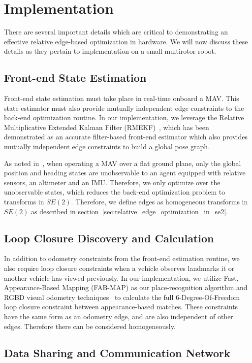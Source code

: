 
\section{Implementation}
There are several important details which are critical to demonstrating an effective relative edge-based optimization in hardware.  We will now discuss these details as they pertain to implementation on a small multirotor robot.

\subsection{Front-end State Estimation}Front-end state estimation must take place in real-time onboard a MAV. This state estimator must also provide mutually independent edge constraints to the back-end optimization routine.  In our implementation, we leverage the Relative Multiplicative Extended Kalman Filter (RMEKF)~\cite{Koch2017}, which has been demonstrated as an accurate filter-based front-end estimator which also provides mutually independent edge constraints to build a global pose graph.

As noted in~\cite{Wheeler2017a}, when operating a MAV over a flat ground plane, only the global position and heading states are unobservable to an agent equipped with relative sensors, an altimeter and an IMU.  Therefore, we only optimize over the unobservable states, which reduces the back-end optimization problem to transforms in $SE(2)$.  Therefore, we define edges as homogeneous transforms in $SE(2)$ as described in section~\ref{sec:relative_edge_optimization_in_se2}.

\subsection{Loop Closure Discovery and Calculation}
In addition to odometry constraints from the front-end estimation routine, we also require loop closure constraints when a vehicle observes landmarks it or another vehicle has viewed previously.  In our implementation, we utilize Fast, Appearance-Based Mapping (FAB-MAP) as our place-recognition algorithm and RGBD visual odometry techniques~\cite{Leishman2013} to calculate the full 6-Degree-Of-Freedom loop closure constraint between appearance-based matches.  These constraints have the same form as an odometry edge, and are also independent of other edges.  Therefore there can be considered homogeneously.

\subsection{Data Sharing and Communication Network}
